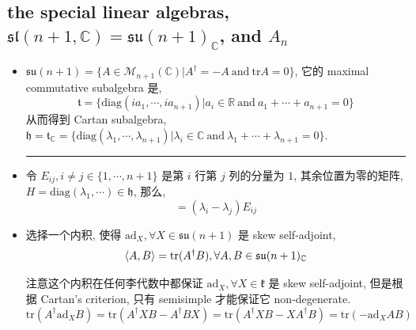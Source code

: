 \subsection{the special linear algebras, \texorpdfstring{$\mathfrak{sl}(n + 1, \mathbb{C}) = \mathfrak{su}(n + 1)_\mathbb{C}$}{sl(n + 1, C) = su(n + 1)\_C}, and \texorpdfstring{$A_n$}{A\_n}} \label{subsection 6.7.1}
\begin{itemize}
	\item $\mathfrak{su}(n + 1) = \{A \in \mathcal{M}_{n + 1}(\mathbb{C}) | A^\dag = - A \ \text{and} \ \mathrm{tr} A = 0\}$, 它的 maximal commutative subalgebra 是,
	\begin{equation}
		\mathfrak{t} = \{\mathrm{diag}(i a_1, \cdots, i a_{n + 1}) | a_i \in \mathbb{R} \ \text{and} \ a_1 + \cdots + a_{n + 1} = 0\}
	\end{equation}
	从而得到 Cartan subalgebra, $\mathfrak{h} = \mathfrak{t}_\mathbb{C} = \{\mathrm{diag}(\lambda_1, \cdots, \lambda_{n + 1}) | \lambda_i \in \mathbb{C} \ \text{and} \ \lambda_1 + \cdots + \lambda_{n + 1} = 0\}$.
	
	\noindent\rule[0.5ex]{\linewidth}{0.5pt} %
	
	\item 令 $E_{i j}, i \neq j \in \{1, \cdots, n + 1\}$ 是第 $i$ 行第 $j$ 列的分量为 $1$, 其余位置为零的矩阵, $H = \mathrm{diag}(\lambda_1, \cdots) \in \mathfrak{h}$, 那么,
	\begin{equation}
		[H, E_{i j}] = (\lambda_i - \lambda_j) E_{i j}
	\end{equation}
	
	\item 选择一个内积, 使得 $\mathrm{ad}_X, \forall X \in \mathfrak{su}(n + 1)$ 是 skew self-adjoint,
	\begin{equation} \label{6.7.5}
		\braket{A, B} = \mathrm{tr}(A^\dag B), \forall A, B \in \mathfrak{su}(n + 1)_\mathbb{C}
	\end{equation}
	
	\begin{tcolorbox}[title=proof:]
		注意这个内积在任何李代数中都保证 $\mathrm{ad}_X, \forall X \in \mathfrak{k}$ 是 skew self-adjoint, 但是根据 Cartan's criterion, 只有 semisimple 才能保证它 non-degenerate.
		\begin{equation}
			\mathrm{tr}(A^\dag \mathrm{ad}_X B) = \mathrm{tr}(A^\dag X B - A^\dag B X) = \mathrm{tr}(A^\dag X B - X A^\dag B) = \mathrm{tr}(- \mathrm{ad}_X A B)
		\end{equation}
	\end{tcolorbox}
	

\end{itemize}
